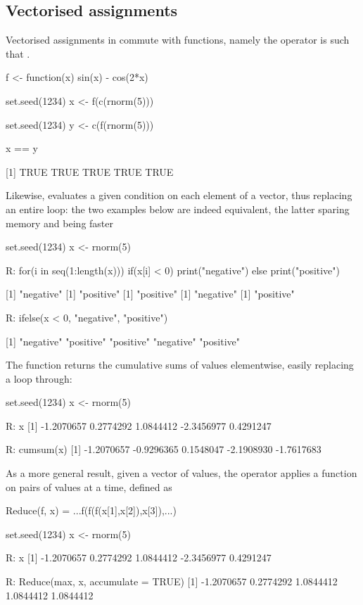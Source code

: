 \subsection{Vectorised assignments}
Vectorised assignments in  commute with 
functions, namely the operator  is such
that .
\begin{example}
f <- function(x) sin(x) - cos(2*x)

set.seed(1234)
x <- f(c(rnorm(5)))

set.seed(1234)
y <- c(f(rnorm(5)))

x == y

[1] TRUE TRUE TRUE TRUE TRUE
\end{example}
Likewise,  evaluates a given 
condition on each element of a vector, thus 
replacing an entire loop: the two examples 
below are indeed equivalent, the latter sparing
memory and being faster
\begin{example}
set.seed(1234)
x <- rnorm(5)

R: for(i in seq(1:length(x))){
      if(x[i] < 0){
        print("negative")
      } else {
        print("positive")
      }
    }

[1] "negative"
[1] "positive"
[1] "positive"
[1] "negative"
[1] "positive"


R: ifelse(x < 0, "negative", "positive")

[1] "negative" "positive" "positive" "negative" "positive"
\end{example}
The function  returns the cumulative 
sums of values elementwise, easily replacing a 
loop through:
\begin{example}
set.seed(1234)
x <- rnorm(5)

R: x
[1] -1.2070657  0.2774292  1.0844412 -2.3456977  0.4291247

R: cumsum(x)
[1] -1.2070657 -0.9296365  0.1548047 -2.1908930 -1.7617683
\end{example}
\enlargethispage{\baselineskip}
As a more general result, given a vector of 
values, the operator 
applies a function on pairs of values at 
a time, defined as
\begin{example}
Reduce(f, x) = ...f(f(f(x[1],x[2]),x[3]),...)

set.seed(1234)
x <- rnorm(5)

R: x
[1] -1.2070657  0.2774292  1.0844412 -2.3456977  0.4291247

R: Reduce(max, x, accumulate = TRUE)
[1] -1.2070657  0.2774292  1.0844412  1.0844412  1.0844412
\end{example}




